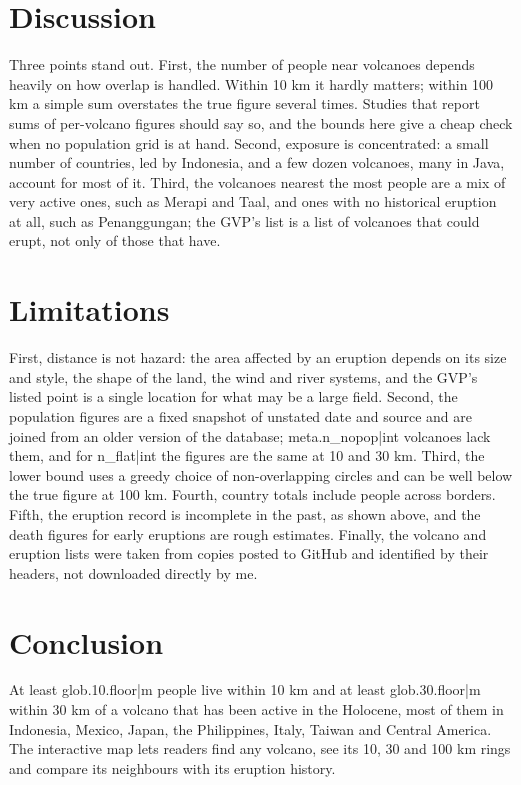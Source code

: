 \documentclass[11pt,a4paper]{article}
\begin{document}
\section{Discussion}
Three points stand out. First, the number of people near volcanoes depends heavily on how overlap is handled. Within 10 km it hardly matters; within 100 km a simple sum overstates the true figure several times. Studies that report sums of per-volcano figures should say so, and the bounds here give a cheap check when no population grid is at hand. Second, exposure is concentrated: a small number of countries, led by Indonesia, and a few dozen volcanoes, many in Java, account for most of it. Third, the volcanoes nearest the most people are a mix of very active ones, such as Merapi and Taal, and ones with no historical eruption at all, such as Penanggungan; the GVP's list is a list of volcanoes that could erupt, not only of those that have.

\section{Limitations}
First, distance is not hazard: the area affected by an eruption depends on its size and style, the shape of the land, the wind and river systems, and the GVP's listed point is a single location for what may be a large field. Second, the population figures are a fixed snapshot of unstated date and source and are joined from an older version of the database; {{meta.n_nopop|int}} volcanoes lack them, and for {{n_flat|int}} the figures are the same at 10 and 30 km. Third, the lower bound uses a greedy choice of non-overlapping circles and can be well below the true figure at 100 km. Fourth, country totals include people across borders. Fifth, the eruption record is incomplete in the past, as shown above, and the death figures for early eruptions are rough estimates. Finally, the volcano and eruption lists were taken from copies posted to GitHub and identified by their headers, not downloaded directly by me.

\section{Conclusion}
At least {{glob.10.floor|m}} people live within 10 km and at least {{glob.30.floor|m}} within 30 km of a volcano that has been active in the Holocene, most of them in Indonesia, Mexico, Japan, the Philippines, Italy, Taiwan and Central America. The interactive map lets readers find any volcano, see its 10, 30 and 100 km rings and compare its neighbours with its eruption history.
\end{document}
